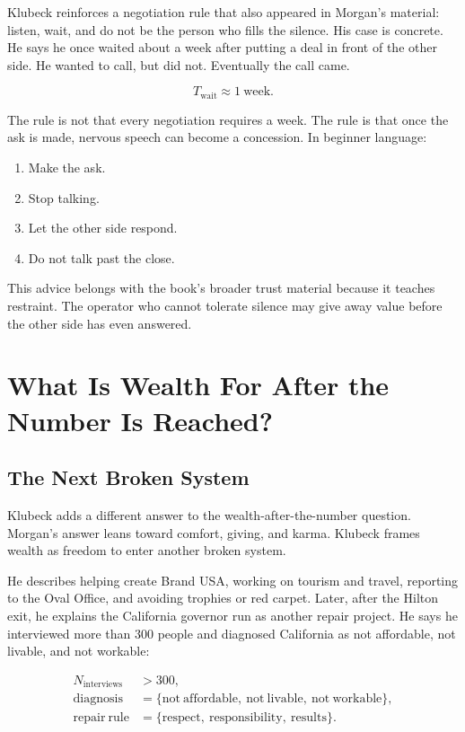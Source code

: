 \documentclass[11pt,oneside]{book}
\begin{document}
Klubeck reinforces a negotiation rule that also appeared in Morgan's material: listen, wait, and do not be the person who fills the silence. His case is concrete. He says he once waited about a week after putting a deal in front of the other side. He wanted to call, but did not. Eventually the call came.

\begin{equation}
T_{\mathrm{wait}}\approx 1\ \mathrm{week}.
\end{equation}

The rule is not that every negotiation requires a week. The rule is that once the ask is made, nervous speech can become a concession. In beginner language:

\begin{enumerate}
\item Make the ask.
\item Stop talking.
\item Let the other side respond.
\item Do not talk past the close.
\end{enumerate}

This advice belongs with the book's broader trust material because it teaches restraint. The operator who cannot tolerate silence may give away value before the other side has even answered.

\chapter{What Is Wealth For After the Number Is Reached?}

\section{The Next Broken System}

Klubeck adds a different answer to the wealth-after-the-number question. Morgan's answer leans toward comfort, giving, and karma. Klubeck frames wealth as freedom to enter another broken system.

He describes helping create Brand USA, working on tourism and travel, reporting to the Oval Office, and avoiding trophies or red carpet. Later, after the Hilton exit, he explains the California governor run as another repair project. He says he interviewed more than \(300\) people and diagnosed California as not affordable, not livable, and not workable:

\begin{align}
N_{\mathrm{interviews}} &> 300,\\
\mathrm{diagnosis} &= \{\mathrm{not\ affordable},\ \mathrm{not\ livable},\ \mathrm{not\ workable}\},\\
\mathrm{repair\ rule} &= \{\mathrm{respect},\ \mathrm{responsibility},\ \mathrm{results}\}.
\end{align}
\end{document}
